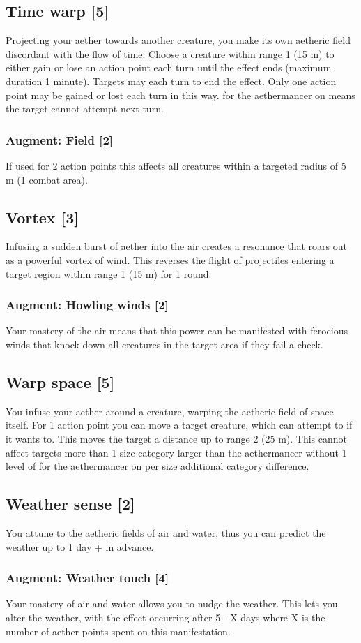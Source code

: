 \subsection{Time warp [5]}
Projecting your aether towards another creature, you make its own aetheric field discordant with the flow of time. Choose a creature within range 1 (15 m) to either gain or lose an action point each turn until the effect ends (maximum duration 1 minute). Targets may  each turn to end the effect. Only one action point may be gained or lost each turn in this way.  for the aethermancer on  means the target cannot attempt  next turn.
\subsubsection{Augment: Field [2]}
If used for 2 action points this affects all creatures within a targeted radius of 5 m (1 combat area).


\subsection{Vortex [3]}
Infusing a sudden burst of aether into the air creates a resonance that roars out as a powerful vortex of wind. This reverses the flight of projectiles entering a target region within range 1 (15 m) for 1 round. 
\subsubsection{Augment: Howling winds [2]}
Your mastery of the air means that this power can be  manifested with ferocious winds that knock down all creatures in the target area if they fail a  check.


\subsection{Warp space [5]}
You infuse your aether around a creature, warping the aetheric field of space itself. For 1 action point you can move a target creature, which can attempt to  if it wants to. This moves the target a distance up to range 2 (25 m). This cannot affect targets more than 1 size category larger than the aethermancer without 1 level of  for the aethermancer on  per size additional category difference.


\subsection{Weather sense [2]}
You attune to the aetheric fields of air and water, thus you can predict the weather up to 1 day +  in advance.
\subsubsection{Augment: Weather touch [4]}
Your mastery of air and water allows you to nudge the weather. This lets you alter the weather, with the effect occurring after 5 - X days where X is the number of aether points spent on this manifestation. 